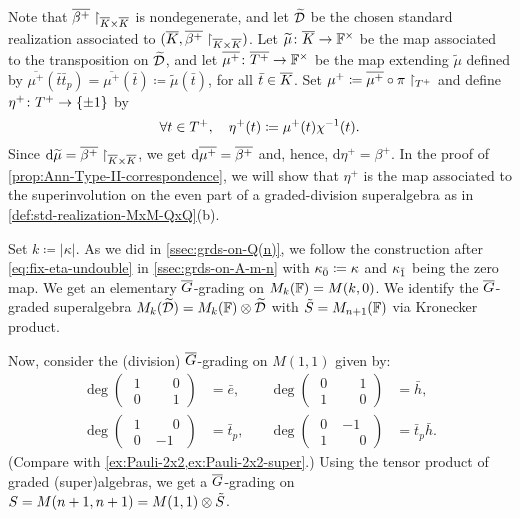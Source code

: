 Note that $\barr {\beta^+}\restriction_{\barr K \times \barr K}$ is nondegenerate, and let $\widetilde {\mathcal{D}}$ be the chosen standard realization associated to $(\barr{K}, \barr{\beta^+}\restriction_{\barr K \times \barr K})$. 
Let $ {\widetilde\mu}\from \barr{K} \to \FF^\times$ be the map associated to the transposition on $\widetilde {\mathcal{D}}$, and let $\barr{\mu^+}\from \barr{T^+} \to \FF^\times$ be the map extending $\widetilde\mu$ defined by $\overline{\mu^+}(\bar t \bar t_p) = \overline{\mu^+}(\bar t) \coloneqq \widetilde\mu (\bar t)$, for all $\bar t\in \barr K$. 
Set $\mu^+ \coloneqq \barr {\mu^+} \circ \pi\restriction_{T^+}$ and define $\eta^+\colon T^+ \to \{ \pm 1 \}$ by
\[\label{eq:fix-eta-plus-undouble-Ann}
    \forall t\in T^+, \quad \eta^+(t) \coloneqq \mu^+(t) \chi^{-1}(t).
\] 
Since $\mathrm{d} \widetilde\mu = \barr{\beta^+}\restriction_{\barr K \times \barr K}$, we get $\mathrm{d} \overline{\mu^+} = \barr{\beta^+}$ and, hence, $\mathrm{d} \eta^+ = \beta^+$.  
In the proof of \cref{prop:Ann-Type-II-correspondence}, we will show that $\eta^+$ is the map associated to the superinvolution on the even part of a graded-division superalgebra as in \cref{def:std-realization-MxM-QxQ}(b). 

Set $k \coloneqq |\kappa|$. 
As we did in \cref{ssec:grds-on-Q(n)}, we follow the construction after \cref{eq:fix-eta-undouble} in \cref{ssec:grds-on-A-m-n} with $\kappa_{\bar{0}} \coloneqq \kappa$ and $\kappa_{\bar{1}}$ being the zero map. 
We get an elementary $\barr G$-grading on $M_k(\mathbb{F}) = M(k , 0)$. 
We identify the $\barr G$-graded superalgebra $M_{k}(\widetilde {\mathcal{D}}) = M_{k}(\mathbb{F}) \otimes \widetilde {\mathcal{D}}$ with $\tilde S = M_{n+1}(\mathbb{F})$ via Kronecker product. 

Now, consider the (division) $\barr G$-grading on $M(1,1)$ given by:
%
\[\label{eq:bar-G-grd-on-M(1-1)}
\begin{aligned}
	\deg \left(\begin{array}{c|c}
		 \phantom{.}1\phantom{.} & \phantom{-}0 \\
		\hline
		 \phantom{.}0\phantom{.} & \phantom{-}1 
	\end{array}\right) &= \bar e,\quad & \deg \left(\begin{array}{c|c}
		 \phantom{.}0\phantom{.} & \phantom{-}1 \\
		\hline
		 \phantom{.}1\phantom{.} & \phantom{-}0 
	\end{array}\right) &= \bar h, \\
	\deg \left(\begin{array}{c|c}
		 \phantom{.}1\phantom{.} & \phantom{-}0 \\
		\hline
		 \phantom{.}0\phantom{.} & -1 
	\end{array}\right) &= \bar t_p,\quad &
	\deg \left(\begin{array}{c|c}
		 \phantom{.}0\phantom{.} & -1           \\
		\hline
		 \phantom{.}1\phantom{.} & \phantom{-}0 
	\end{array}\right) &= \bar t_p \bar h.
\end{aligned}
\]
(Compare with \cref{ex:Pauli-2x2,ex:Pauli-2x2-super}.) 
Using the tensor product of graded (super)algebras, we get a $\barr G$-grading on $S = M(n+1, n+1) = M(1,1) \otimes \tilde S$. 

